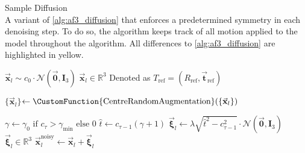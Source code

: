 \begin{suppalgorithm}
    \caption{Sample Diffusion\\
    A variant of \autoref{alg:af3_diffusion} that enforces a predetermined symmetry in each denoising step. To do so, the algorithm keeps track of all motion applied to the model throughout the algorithm. All differences to \autoref{alg:af3_diffusion} are highlighted in yellow.
    }
    {\small
    \begin{algorithmic}[1]
        \State $\vec{\mathbf{x}}_l \sim c_0 \cdot \mathcal{N}(\vec{\mathbf{0}}, \mathbf{I}_3)$ \hfill $\vec{\mathbf{x}}_l \in \mathbb{R}^3$
         \hfill Denoted as $T_{\text{ref}}=(R_{\text{ref}}, \vec{\mathbf{t}}_{\text{ref}})$
        
            \State $\{\vec{\mathbf{x}}_l\}$$ \gets \CustomFunction{\text{CentreRandomAugmentation}}(\{\vec{\mathbf{x}}_l\})$
            
            \State $\gamma \gets \gamma_0 \text{ if } c_\tau > \gamma_{\min} \text{ else } 0$
            \State $\hat{t} \gets c_{\tau-1}(\gamma + 1)$
            \State $\vec{\boldsymbol{\xi}}_l \gets \lambda \sqrt{\hat{t}^2 - c_{\tau-1}^2} \cdot \mathcal{N}(\vec{\mathbf{0}}, \mathbf{I}_3)$ \hfill $\vec{\boldsymbol{\xi}}_l \in \mathbb{R}^3$
            \State $\vec{\mathbf{x}}_l^{\text{noisy}} \gets \vec{\mathbf{x}}_l + \vec{\boldsymbol{\xi}}_l$
            

\end{algorithmic}}
\end{suppalgorithm}
